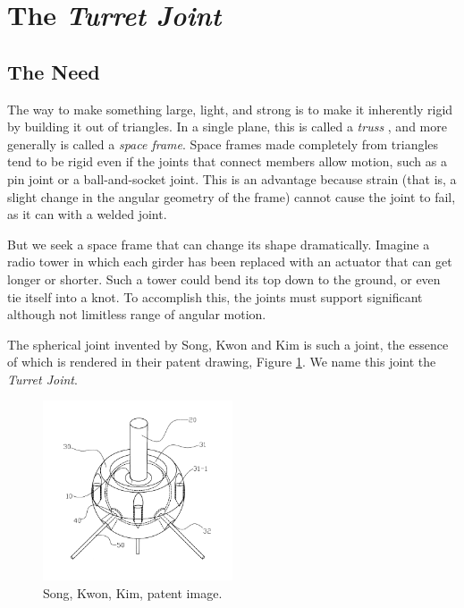 \documentclass[11pt]{article}
\begin{document}
\section{The \textit{Turret Joint}}

\subsection{The Need}

The way to make something large, light, and strong is to make it inherently rigid by building it
out of triangles. In a single plane, this is called a \emph{truss} \cite{ambrose1993building}, and more generally is called
a \emph{space frame}.  Space frames made completely from triangles tend to be rigid even if the
joints that connect members allow motion, such as a pin joint or a ball-and-socket joint. This
is an advantage because strain (that is, a slight change in the angular geometry of the frame) cannot cause
the joint to fail, as it can with a welded joint.

But we seek a space frame that can change its shape dramatically. Imagine a radio tower in which
each girder has been replaced with an actuator that can get longer or shorter. Such a tower could
bend its top down to the ground, or even
tie itself into a knot. To accomplish this, the joints must support significant although not
limitless range of angular motion. 

The spherical joint invented by Song, Kwon and Kim \cite{song2003spherical} is such a joint,
the essence of which is rendered in their patent drawing, Figure \ref{SongKwonKimImage}.
We name this joint the \emph{Turret Joint}.

\begin{figure}[H]
  \centering
    \includegraphics[width=0.5\textwidth]{figures/SongKwonKimImage.png}
    \caption[Song, Kwon, Kim, patent image.]{Song, Kwon, Kim, patent image.}
      \label{SongKwonKimImage}
\end{figure}
\end{document}
